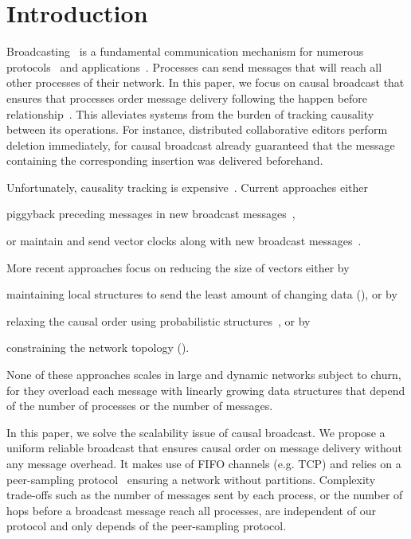 
\section{Introduction}


Broadcasting~\cite{hadzilacos1994modular} is a fundamental communication
mechanism for numerous
protocols~\cite{nakamoto2009bitcoin,shapiro2011comprehensive} and
applications~\cite{nedelec2016crate}. Processes can send messages that will
reach all other processes of their network. In this paper, we focus on causal
broadcast that ensures that processes order message delivery following the
happen before relationship~\cite{lamport1978time}. This alleviates systems from
the burden of tracking causality between its operations. For instance,
distributed collaborative editors perform deletion immediately, for causal
broadcast already guaranteed that the message containing the corresponding
insertion was delivered beforehand.

Unfortunately, causality tracking is
expensive~\cite{charronbost1991concerning}. Current approaches either
\begin{inparaenum}[(i)]
\item piggyback preceding messages in new broadcast
  messages~\cite{birman1987reliable,hadzilacos1993fault},
\item or maintain and send vector clocks along with new broadcast
  messages~\cite{fidge1988timestamps,mattern1989virtual}.
\end{inparaenum}
More recent approaches focus on reducing the size of vectors either by
\begin{inparaenum}[(a)]
\item maintaining local structures to send the least amount of changing data
  (\REF), or by
\item relaxing the causal order using probabilistic
  structures~\cite{mostefaoui2017probabilistic}, or by
\item constraining the network topology (\REF).
\end{inparaenum}
None of these approaches scales in large and dynamic networks subject to churn,
for they overload each message with linearly growing data structures that depend
of the number of processes or the number of messages.

In this paper, we solve the scalability issue of causal broadcast. We propose a
uniform reliable broadcast that ensures causal order on message delivery without
any message overhead.  It makes use of FIFO channels (e.g. TCP) and relies on a
peer-sampling protocol~\cite{jelasity2007gossip} ensuring a network without
partitions.  Complexity trade-offs such as the number of messages sent by each
process, or the number of hops before a broadcast message reach all processes,
are independent of our protocol and only depends of the peer-sampling protocol.

